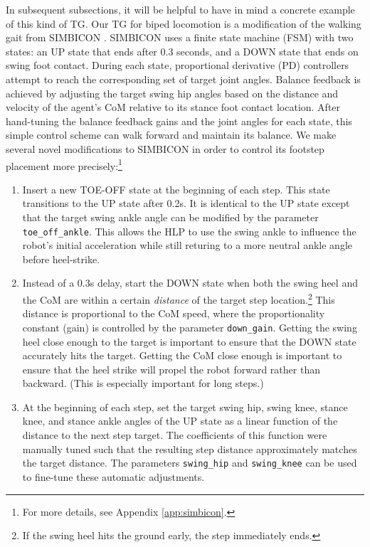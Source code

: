 \documentclass[a4paper]{article}
\begin{document}
In subsequent subsections, it will be helpful to have in mind a concrete example of this kind of TG.
Our TG for biped locomotion is a modification of the walking gait from SIMBICON \citep{yin2007simbicon}.
SIMBICON uses a finite state machine (FSM) with two states: an UP state that ends after 0.3 seconds, and a DOWN state that ends on swing foot contact.
During each state, proportional derivative (PD) controllers attempt to reach the corresponding set of target joint angles.
Balance feedback is achieved by adjusting the target swing hip angles based on the distance and velocity of the agent's CoM relative to its stance foot contact location.
After hand-tuning the balance feedback gains and the joint angles for each state, this simple control scheme can walk forward and maintain its balance.
We make several novel modifications to SIMBICON in order to control its footstep placement more precisely:\footnote{
For more details, see Appendix \ref{app:simbicon}.}
\begin{enumerate}
  \item Insert a new TOE-OFF state at the beginning of each step.
    This state transitions to the UP state after 0.2s.
    It is identical to the UP state except that the target swing ankle angle can be modified by the parameter \texttt{toe\_off\_ankle}.
    This allows the HLP to use the swing ankle to influence the robot's initial acceleration while still returing to a more neutral ankle angle before heel-strike.

  \item Instead of a 0.3s delay, start the DOWN state when both the swing heel and the CoM are within a certain \emph{distance} of the target step location.\footnote{
    If the swing heel hits the ground early, the step immediately ends.}
    This distance is proportional to the CoM speed, where the proportionality constant (gain) is controlled by the parameter \texttt{down\_gain}.
    Getting the swing heel close enough to the target is important to ensure that the DOWN state accurately hits the target.
    Getting the CoM close enough is important to ensure that the heel strike will propel the robot forward rather than backward.
    (This is especially important for long steps.)

  \item At the beginning of each step, set the target swing hip, swing knee, stance knee, and stance ankle angles of the UP state as a linear function of the distance to the next step target.
    The coefficients of this function were manually tuned such that the resulting step distance approximately matches the target distance.
    The parameters \texttt{swing\_hip} and \texttt{swing\_knee} can be used to fine-tune these automatic adjustments.
\end{enumerate}
\end{document}
